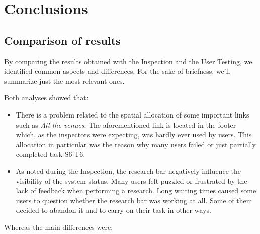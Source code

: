 
\section{Conclusions}
\subsection{Comparison of results}

By comparing the results obtained with the Inspection and the User Testing, we identified common aspects and differences. For the sake of briefness, we'll summarize just the most relevant ones. 

Both analyses showed that: 

\begin{itemize}
    \item There is a problem related to the spatial allocation of some important links such as \emph{All the venues}. The aforementioned link is located in the footer which, as the inspectors were expecting, was hardly ever used by users. This allocation in particular was the reason why many users failed or just partially completed task S6-T6.
\end{itemize}

\begin{itemize}
    \item As noted during the Inspection, the research bar negatively influence the visibility of the system status. Many users felt puzzled or frustrated by the lack of feedback when performing a research. Long waiting times caused some users to question whether the research bar was working at all. Some of them decided to abandon it and to carry on their task in other ways.
\end{itemize}

Whereas the main differences were:

